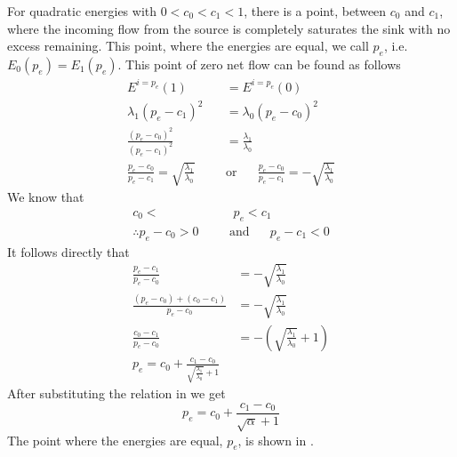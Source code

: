 For quadratic energies with $0 < c_0 < c_1 < 1$, there is a point, between $c_0$ and $c_1$, where the incoming flow from the source is completely saturates the sink with no excess remaining. This point, where the energies are equal, we call $p_e$, i.e. $E_0(p_e) = E_1(p_e)$. This point of zero net flow can be found as follows
\begin{equation*}\begin{split}
	E^{i=p_e}(1) & = E^{i=p_e}(0) \\
	\lambda_1(p_e - c_1)^2 & = \lambda_0(p_e - c_0)^2 \\
	\frac{(p_e - c_0)^2}{(p_e - c_1)^2} & = \frac{\lambda_1}{\lambda_0}\\
	\frac{p_e - c_0}{p_e - c_1}  = \sqrt{\frac{\lambda_1}{\lambda_0}} \hspace{20pt}&\text{or}\hspace{20pt}\frac{p_e - c_0}{p_e - c_1}  = -\sqrt{\frac{\lambda_1}{\lambda_0}}
\end{split}\end{equation*}
We know that 
\begin{equation*}\begin{split}
	c_0 < &\,\, p_e < c_1 \\
	\therefore p_e-c_0 >0 \hspace{20pt}&\text{and}\hspace{20pt} p_e-c_1 < 0 
\end{split}\end{equation*}
It follows directly that
\begin{equation*}\begin{split}
	\frac{p_e-c_1}{p_e-c_0} &= -\sqrt{\frac{\lambda_1}{\lambda_0}} \\
	\frac{(p_e-c_0)+(c_0-c_1)}{p_e-c_0} &= -\sqrt{\frac{\lambda_1}{\lambda_0}}\\
	\frac{c_0-c_1}{p_e-c_0} &= -\left( \sqrt{\frac{\lambda_1}{\lambda_0}} + 1\right)\\
	p_e = c_0 + \frac{c_1-c_0}{\sqrt{\frac{\lambda_1}{\lambda_0}} + 1}
\end{split}\end{equation*}
After substituting the relation in  we get
\begin{equation}
	p_e = c_0 + \frac{c_1-c_0}{\sqrt{\alpha} + 1}
	\label{eq:pe}
\end{equation}
The point where the energies are equal, $p_e$, is shown in .

